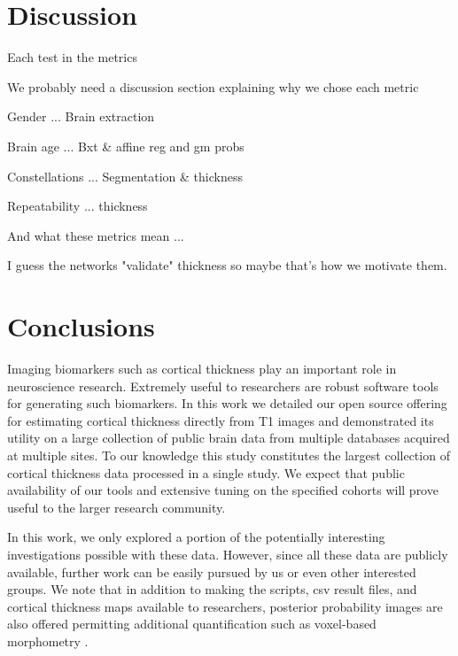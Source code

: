 \section{Discussion}

Each test in the metrics

We probably need a discussion section explaining why we chose each metric 

Gender ... Brain extraction

Brain age ... Bxt & affine reg and gm probs

Constellations ... Segmentation & thickness 

Repeatability ... thickness

And what these metrics mean ... 

I guess the networks "validate" thickness so maybe that's how we motivate them.



\section{Conclusions}

Imaging biomarkers such as cortical thickness play an 
important role in neuroscience research.  Extremely useful to
researchers are robust software tools for generating such 
biomarkers.  In this work we detailed our open source offering for estimating
cortical thickness directly from T1 images and demonstrated
its utility on a large collection of public brain data from
multiple databases acquired at multiple sites.  To our knowledge
this study constitutes the largest collection of cortical
thickness data processed in a single study.  
We expect that public availability of our tools and extensive tuning on 
the specified cohorts will prove useful to the larger
research community.  

In this work, we only explored a portion of the potentially
interesting investigations possible with these data.  However,
since all these data are publicly available, further work can
be easily pursued by us or even other interested groups.  We 
note that in addition to making the scripts, csv result files,
and cortical thickness maps available to researchers, 
posterior probability images are also offered permitting additional
quantification such as voxel-based morphometry \citep{ashburner2000}.
